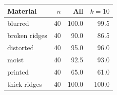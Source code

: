 \begin{tabular}{l r rr}
\toprule
Material & $n$ & All & $k{=}10$ \\
\midrule
blurred & 40 & 100.0 & 99.5 \\
broken ridges & 40 & 90.0 & 86.5 \\
distorted & 40 & 95.0 & 96.0 \\
moist & 40 & 92.5 & 93.0 \\
printed & 40 & 65.0 & 61.0 \\
thick ridges & 40 & 100.0 & 100.0 \\
\bottomrule
\end{tabular}
